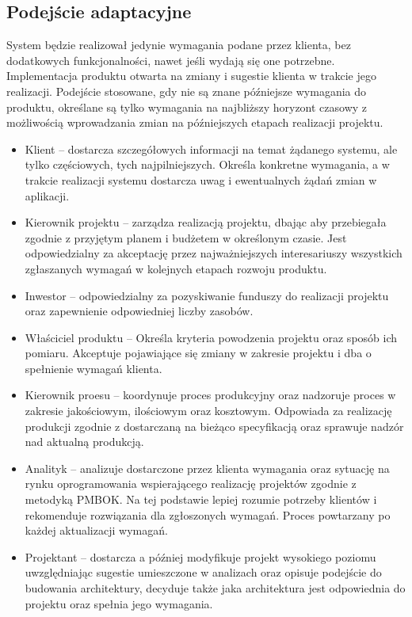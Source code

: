 \subsection*{Podejście adaptacyjne}
System będzie realizował jedynie wymagania podane przez klienta, bez dodatkowych funkcjonalności, nawet jeśli wydają się one potrzebne. Implementacja produktu otwarta na zmiany i sugestie klienta w trakcie jego realizacji. Podejście stosowane, gdy nie są znane późniejsze wymagania do produktu, określane są tylko wymagania na najbliższy horyzont czasowy z możliwością wprowadzania zmian na późniejszych etapach realizacji projektu.
\begin{itemize}
\item Klient – dostarcza szczegółowych informacji na temat żądanego systemu, ale tylko częściowych, tych najpilniejszych. Określa konkretne wymagania, a w trakcie realizacji systemu dostarcza uwag i ewentualnych żądań zmian w aplikacji.
\item Kierownik projektu – zarządza realizacją projektu, dbając aby przebiegała zgodnie z przyjętym planem i budżetem w określonym czasie. Jest odpowiedzialny za akceptację przez najważniejszych interesariuszy wszystkich zgłaszanych wymagań w kolejnych etapach rozwoju produktu.
\item Inwestor – odpowiedzialny za pozyskiwanie funduszy do realizacji projektu oraz zapewnienie odpowiedniej liczby zasobów.
\item Właściciel produktu – Określa kryteria powodzenia projektu oraz sposób ich pomiaru. Akceptuje pojawiające się zmiany w zakresie projektu i dba o spełnienie wymagań klienta.
\item Kierownik proesu – koordynuje proces produkcyjny oraz nadzoruje proces w zakresie jakościowym, ilościowym oraz kosztowym. Odpowiada za realizację produkcji zgodnie z dostarczaną na bieżąco specyfikacją oraz sprawuje nadzór nad aktualną produkcją.
\item Analityk – analizuje dostarczone przez klienta wymagania oraz sytuację na rynku oprogramowania wspierającego realizację projektów zgodnie z metodyką PMBOK. Na tej podstawie lepiej rozumie potrzeby klientów i rekomenduje rozwiązania dla zgłoszonych wymagań. Proces powtarzany po każdej aktualizacji wymagań.
\item Projektant – dostarcza a później modyfikuje projekt wysokiego poziomu uwzględniając sugestie umieszczone w analizach oraz opisuje podejście do budowania architektury, decyduje także jaka architektura jest odpowiednia do projektu oraz spełnia jego wymagania.

\end{itemize}

